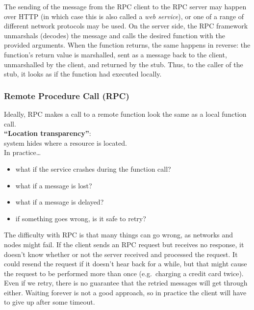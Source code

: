 The sending of the message from the RPC client to the RPC server may happen over HTTP (in which case this is also called a \emph{web service}), or one of a range of different network protocols may be used.
On the server side, the RPC framework unmarshals (decodes) the message and calls the desired function with the provided arguments.
When the function returns, the same happens in reverse: the function's return value is marshalled, sent as a message back to the client, unmarshalled by the client, and returned by the stub.
Thus, to the caller of the stub, it looks as if the function had executed locally.

\begin{frame}
    \label{s:rpc-problems}
    \frametitle{Remote Procedure Call (RPC)}
    Ideally, RPC makes a call to a remote function look the same as a local function call.\\[1em]
    \textbf{``Location transparency''}:\\ system hides where a resource is located.\\[1em]\pause
    In practice\dots
    \begin{itemize}
        \item what if the service crashes during the function call?
        \item what if a message is lost?
        \item what if a message is delayed?
        \item if something goes wrong, is it safe to retry?
    \end{itemize}
\end{frame}

The difficulty with RPC is that many things can go wrong, as networks and nodes might fail.
If the client sends an RPC request but receives no response, it doesn't know whether or not the server received and processed the request.
It could resend the request if it doesn't hear back for a while, but that might cause the request to be performed more than once (e.g.\ charging a credit card twice).
Even if we retry, there is no guarantee that the retried messages will get through either.
Waiting forever is not a good approach, so in practice the client will have to give up after some timeout.

